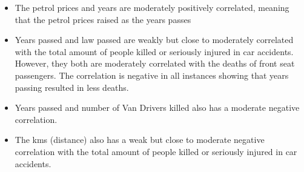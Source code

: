 \documentclass[
]{article}
\begin{document}
\begin{itemize}
\item
  The petrol prices and years are moderately positively correlated,
  meaning that the petrol prices raised as the years passes
\item
  Years passed and law passed are weakly but close to moderately
  correlated with the total amount of people killed or seriously injured
  in car accidents. However, they both are moderately correlated with
  the deaths of front seat passengers. The correlation is negative in
  all instances showing that years passing resulted in less deaths.
\item
  Years passed and number of Van Drivers killed also has a moderate
  negative correlation.
\item
  The kms (distance) also has a weak but close to moderate negative
  correlation with the total amount of people killed or seriously
  injured in car accidents.
\end{itemize}
\end{document}

